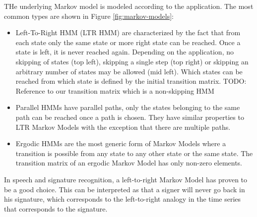 \documentclass[a4paper, oneside]{csthesis}
\begin{document}
THe underlying Markov model is modeled according to the application. The most common types are shown in Figure \ref{fig:markov-models}:
\begin{itemize}
\item Left-To-Right HMM (LTR HMM) are characterized by the fact that from each state only the same state or more right state can be reached. Once a state is left, it is never reached again. Depending on the application, no skipping of states (top left), skipping a single step (top right) or skipping an arbitrary number of states may be allowed (mid left). Which states can be reached from which state is defined by the initial transition matrix. TODO: Reference to our transition matrix which is a non-skipping HMM
\item Parallel HMMs have parallel paths, only the states belonging to the same path can be reached once a path is chosen. They have similar properties to LTR Markov Models with the exception that there are multiple paths.
\item Ergodic HMMs are the most generic form of Markov Models where a transition is possible from any state to any other state or the same state. The transition matrix of an ergodic Markov Model has only non-zero elements.
\end{itemize}

In speech and signature recognition, a left-to-right Markov Model has proven to be a good choice. This can be interpreted as that a signer will never go back in his signature, which corresponds to the left-to-right analogy in the time series that corresponds to the signature.
\end{document}

